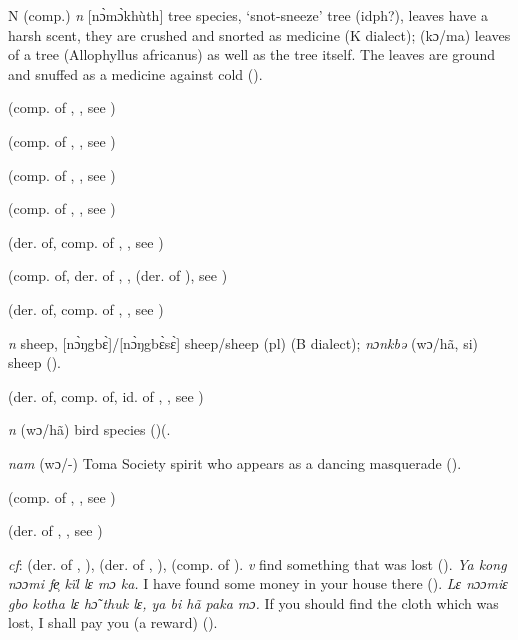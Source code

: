 \begin{letter}{N}
 (comp.) \textit{n} [nɔ̀mɔ̀khùth] tree species, ‘snot-sneeze' tree (idph?), leaves have a harsh scent, they are crushed and snorted as medicine (K dialect); (kɔ/ma) leaves of a tree (Allophyllus africanus) as well as the tree itself. The leaves are ground and snuffed as a medicine against cold (\citealt{Pichl1967}). 

 (comp. of , , see ) 

 (comp. of , , see ) 

 (comp. of , , see ) 

 (comp. of , , see ) 

 (der. of, comp. of , , see ) 

 (comp. of, der. of , ,  (der. of ), see ) 

 (der. of, comp. of , , see ) 

 \textit{n} sheep, [nɔ̀ŋgbɛ̀]/[nɔ̀ŋgbɛ̀sɛ̀] sheep/sheep (pl) (B dialect); \textit{nɔnkbə} (wɔ/hã, si) sheep (\citealt{Pichl1967}). 

 (der. of, comp. of, id. of , , see ) 

 \textit{n} (wɔ/hã) bird species (\citealt{Pichl1967})(.

 \textit{nam} (wɔ/-) Toma Society spirit who appears as a dancing masquerade (\citealt{Pichl1967}).

 (comp. of , , see ) 

 (der. of , , see ) 

 \textit{cf}:  (der. of , ),  (der. of , ),  (comp. of ). \textit{v} find something that was lost (\citealt{Pichl1967}). \textit{Ya kong nɔɔmi fe̹ kïl lɛ mɔ ka.} I have found some money in your house there (\citealt{Pichl1967}). \textit{Lɛ nɔɔmiɛ gbo kotha lɛ hɔ̃ thuk lɛ, ya bi hã paka mɔ.} If you should find the cloth which was lost, I shall pay you (a reward) (\citealt{Pichl1967}).


\end{letter}

